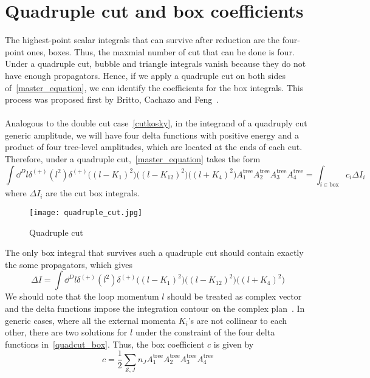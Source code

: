 \section{Quadruple cut and box coefficients}\label{sect-quadcut}
The highest-point scalar integrals that can survive after reduction are the four-point ones, \ie boxes. 
Thus, the maxmial number of cut that can be done is four. 
Under a quadruple cut, bubble and triangle integrals vanish because they do not have enough propagators.
Hence, if we apply a quadruple cut on both sides of~\cref{master_equation}, we can identify the coefficients for the box integrals.
This process was proposed first by Britto, Cachazo and Feng~\cite{Britto:2004nc}.
\\\\
Analogous to the double cut case~\cref{cutkosky}, in the integrand of a quadruply cut generic amplitude, we will have four delta functions with positive energy and a product of four tree-level amplitudes, which are located at the ends of each cut. 
Therefore, under a quadruple cut,~\cref{master_equation} takes the form
\begin{equation}
\int\dd^D l \delta^{(+)}(l^2) \delta^{(+)}\big((l-K_1)^2\big)\big((l-K_{12})^2\big)\big((l+K_4)^2\big)
A_1^{\mathrm{tree}}A_2^{\mathrm{tree}}A_3^{\mathrm{tree}}A_4^{\mathrm{tree}}=
\int_{i\in\mathrm{box}} c_i \Delta I_i
\end{equation}
where $\Delta I_i$ are the cut box integrals.
\begin{figure}[h]
  \centering
  \texttt{[image: quadruple\_cut.jpg]}
  \caption{Quadruple cut}
  \label{fig-quadruple_cut}
\end{figure}
The only box integral that survives such a quadruple cut should contain exactly the some propagators, which gives
\begin{equation}\label{quadcut_box}
\Delta I = \int \dd^D l \delta^{(+)}(l^2) \delta^{(+)}\big((l-K_1)^2\big)\big((l-K_{12})^2\big)\big((l+K_4)^2\big)
\end{equation}
We should note that the loop momentum $l$ should be treated as complex vector and the delta functions impose the integration contour on the complex plan~\cite{PhysRevD.75.025028, Kosower:2011ty}.
In generic cases, where all the external momenta $K_i$'s are not collinear to each other, 
there are two solutions for $l$ under the constraint of the four delta functions in~\cref{quadcut_box}. 
Thus, the box coefficient $c$ is given by
\begin{equation}\label{box_coeff}
c = \frac{1}{2}\sum_{\mathcal{S}, J}n_J A_1^{\mathrm{tree}}A_2^{\mathrm{tree}}A_3^{\mathrm{tree}}A_4^{\mathrm{tree}}
\end{equation}
